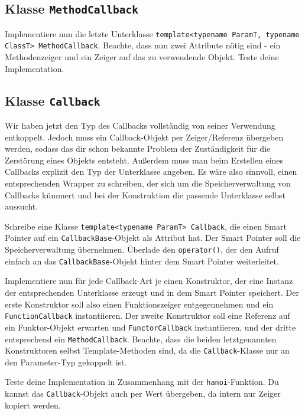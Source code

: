 \subsection{Klasse \lstinline{MethodCallback}}
Implementiere nun die letzte Unterklasse \lstinline{template<typename ParamT, typename ClassT> MethodCallback}.
Beachte, dass nun zwei Attribute nötig sind - ein Methodenzeiger und ein Zeiger auf das zu verwendende Objekt.
Teste deine Implementation.


\subsection{Klasse \lstinline{Callback}}
Wir haben jetzt den Typ des Callbacks vollständig von seiner Verwendung entkoppelt.
Jedoch muss ein Callback-Objekt per Zeiger/Referenz übergeben werden, sodass das dir schon bekannte Problem der Zuständigkeit für die Zerstörung eines Objekts entsteht.
Außerdem muss man beim Erstellen eines Callbacks explizit den Typ der Unterklasse angeben.
Es wäre also sinnvoll, einen entsprechenden Wrapper zu schreiben, der sich um die Speicherverwaltung von Callbacks kümmert und bei der Konstruktion die passende Unterklasse selbst aussucht.

Schreibe eine Klasse \lstinline{template<typename ParamT> Callback}, die einen Smart Pointer auf ein \lstinline{CallbackBase}-Objekt als Attribut hat. Der Smart Pointer soll die Speicherverwaltung übernehmen. Überlade den \lstinline{operator()}, der den Aufruf einfach an das \lstinline{CallbackBase}-Objekt hinter dem Smart Pointer weiterleitet.

Implementiere nun für jede Callback-Art je einen Konstruktor, der eine Instanz der entsprechenden Unterklasse erzeugt und in dem Smart Pointer speichert.
Der erste Konstruktor soll also einen Funktionszeiger entgegennehmen und ein \lstinline{FunctionCallback} instantiieren.
Der zweite Konstruktor soll eine Referenz auf ein Funktor-Objekt erwarten und  \lstinline{FunctorCallback} instantiieren, und der dritte entsprechend ein \lstinline{MethodCallback}.
Beachte, dass die beiden letztgenannten Konstruktoren selbst Template-Methoden sind, da die \lstinline{Callback}-Klasse nur an den Parameter-Typ gekoppelt ist.

Teste deine Implementation in Zusammenhang mit der \lstinline{hanoi}-Funktion. Du kannst das \lstinline{Callback}-Objekt auch per Wert übergeben, da intern nur Zeiger kopiert werden.
